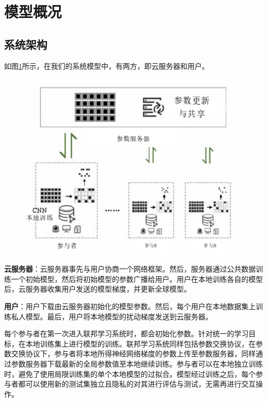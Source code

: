 \section{模型概况}

\subsection{系统架构}
如图\ref{fig:联邦学习的系统架构}所示，在我们的系统模型中，有两方，即云服务器和用户。
\begin{figure}[!hbt]
\centering
	\includegraphics[scale=0.7]{fig2/C3/联邦学习系统架构}%
	\label{fig:联邦学习的系统架构}	
\end{figure}


\textbf{云服务器}：云服务器事先与用户协商一个网络框架。然后，服务器通过公共数据训练一个初始模型，然后将初始模型的参数广播给用户。用户在本地训练各自的模型后，云服务器收集用户发送的模型梯度，并更新全球模型。

\textbf{用户}：用户下载由云服务器初始化的模型参数。然后，每个用户在本地数据集上训练私人模型。最后，用户将本地模型的扰动梯度发送到云服务器。

每个参与者在第一次进入联邦学习系统时，都会初始化参数。针对统一的学习目标，在本地训练集上进行模型的训练。联邦学习系统同样包括参数交换协议，在参数交换协议下，参与者将本地所得神经网络梯度的参数上传至参数服务器，同样通过参数服务器下载最新的全局参数值至本地继续训练。参与者可以在本地独立训练时，避免了使用局限训练集的单个本地模型的过拟合。模型经过训练之后，每个参与者都可以使用新的测试集独立且隐私的对其进行评估与测试，无需再进行交互操作。 

